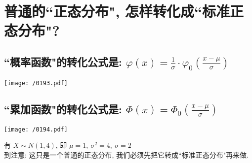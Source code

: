 \documentclass[UTF8]{ctexart}
\begin{document}
\section{普通的``正态分布", 怎样转化成``标准正态分布"?}

\subsection{``概率函数"的转化公式是: $\boxed{
	\varphi (x)=\frac{1}{\sigma}\cdot \varphi _0(\frac{x-\mu}{\sigma})
	}$}

\texttt{[image: /0193.pdf]} \\




\subsection{``累加函数"的转化公式是: $\boxed{\varPhi (x)=\varPhi _0(\frac{x-\mu}{\sigma})	}$}

\texttt{[image: /0194.pdf]} \\



\begin{myEnvSample}
有 $X \sim N(1,4)$, 即 $\mu=1, \ \sigma^2=4,\ \sigma=2$ \\
到注意: 这只是一个普通的正态分布, 我们必须先把它转成``标准正态分布"再来做. \\



\end{myEnvSample}
\end{document}
